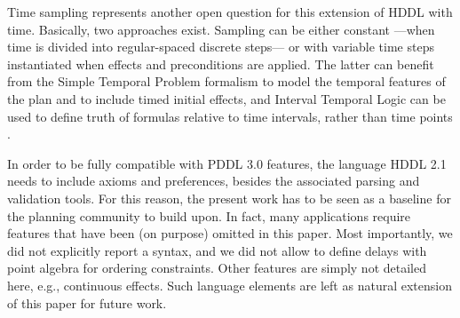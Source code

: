 \documentclass[letterpaper]{article} %
\begin{document}
Time sampling represents another open question for this extension of HDDL with time.
Basically, two approaches exist. Sampling can be either constant ---when time is divided into regular-spaced discrete steps--- or with variable time steps instantiated when effects and preconditions are applied. The latter can benefit from the Simple Temporal Problem formalism to model the temporal features of the plan and to include timed initial effects, and Interval Temporal Logic can be used to define truth of formulas relative to time intervals, rather than time points \citep{BRESOLIN2014269}.



In order to be fully compatible with PDDL 3.0 features, the language HDDL 2.1 needs to include axioms and preferences, besides the associated parsing and validation tools. For this reason, the present work has to be seen as a baseline for the planning community to build upon.
In fact, many applications require features that have been (on purpose) omitted in this paper. Most importantly, we did not explicitly report a syntax, and we did not allow to define delays  with point algebra for ordering constraints. Other features are simply not detailed here, e.g., continuous effects.
Such language elements are left as natural extension of this paper for future work.




\end{document}
